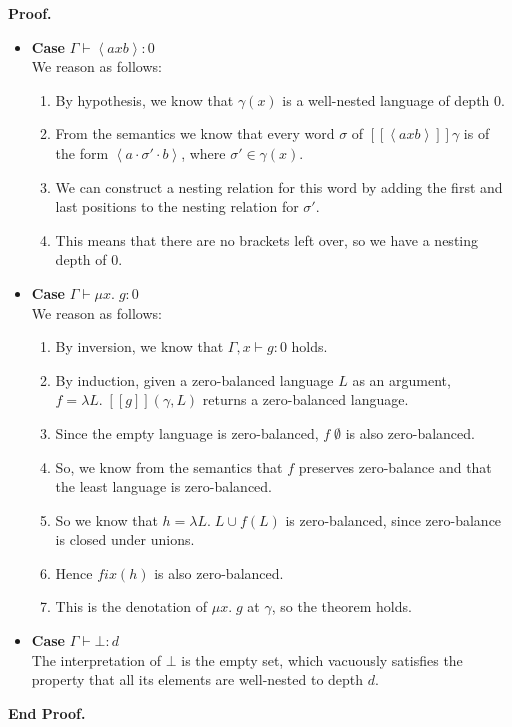 \documentclass{article}
\newcommand{\fix}[2]{\mu {#1}.\;{#2}}
\newcommand{\lft}[1]{\left<{#1}\right.}
\newcommand{\rgt}[1]{\left.{#1}\right>}
\newcommand{\judgebalance}[3][\Gamma]{{#1} \vdash {#2} : {#3}}
\newcommand{\interp}[1]{[\![{#1}]\!]}
\newcommand{\fun}[2]{\lambda {#1}.\;{#2}}
\newenvironment{proof}{\noindent\textbf{Proof.}}
{\noindent\textbf{End Proof.}}
\newenvironment{caseblock}{\begin{itemize}}{\end{itemize}}
\newenvironment{case}[1]{\item \textbf{Case} {#1}\\}{}
\begin{document}
\begin{proof}
\begin{caseblock}
  \begin{case}{$\judgebalance{\lft{a}x\rgt{b}}{0}$}
    We reason as follows: 
    \begin{enumerate}
      \item By hypothesis, we know that $\gamma(x)$ is a well-nested language of depth 0. 
      \item From the semantics we know that every word $\sigma$ of $\interp{\lft{a}x\rgt{b}}\gamma$ is 
        of the form $\lft{a}\cdot\sigma'\cdot\rgt{b}$, where $\sigma' \in \gamma(x)$. 
      \item We can construct a nesting relation for this word by adding the first and last positions 
        to the nesting relation for $\sigma'$. 
      \item This means that there are no brackets left over, so we have a nesting depth of 0. 
    \end{enumerate}
  \end{case}

  \begin{case}{$\judgebalance{\fix{x}{g}}{0}$}
    We reason as follows: 
    \begin{enumerate}
      \item By inversion, we know that $\judgebalance[\Gamma, x]{g}{0}$ holds. 
      \item By induction, given a zero-balanced language $L$ as an argument, $f = \fun{L}{\interp{g}(\gamma,L)}$
        returns a zero-balanced language. 
      \item Since the empty language is zero-balanced, $f\;\emptyset$ is
        also zero-balanced. 
      \item So, we know from the semantics that $f$ preserves zero-balance and that the least language is zero-balanced. 
      \item So we know that $h = \fun{L}{L \cup f(L)}$ is zero-balanced, since zero-balance is closed under unions. 
      \item Hence $\mathit{fix}(h)$ is also zero-balanced. 
      \item This is the denotation of $\fix{x}{g}$ at $\gamma$, so the theorem holds. 
    \end{enumerate}
  \end{case}

  \begin{case}{$\judgebalance{\bot}{d}$}
    The interpretation of $\bot$ is the empty set, which vacuously satisfies the property that
    all its elements are well-nested to depth $d$. 
  \end{case}


\end{caseblock}
\end{proof}
\end{document}
